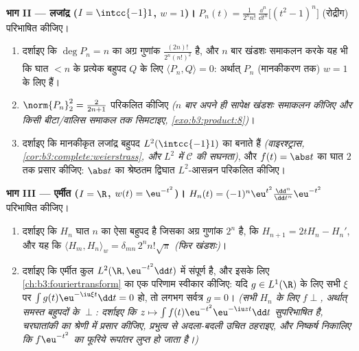 \begin{problem}
\medskip
\noindent\textbf{भाग II --- लजांद्र ($I = \intcc{-1}1$, $w =
1$)।} $P_n(t) = \frac{1}{2^nn!}\,\frac{\dd^n}{\dd
t^n}\bigl[(t^2 - 1)^n\bigr]$
(रोद्रीग) परिभाषित कीजिए।
\begin{enumerate}[resume]
  \item दर्शाइए कि $\deg P_n = n$ का अग्र गुणांक $\frac{(2n)!}{2^n(n!)^2}$ है, और $n$ बार
        खंडशः समाकलन करके यह भी कि घात $< n$ के प्रत्येक बहुपद
        $Q$ के लिए $\langle P_n, Q\rangle = 0$: अर्थात् $P_n$ (मानकीकरण तक) $w = 1$ के
        लिए  हैं।
  \item $\norm{P_n}_2^2 = \frac{2}{2n+1}$ परिकलित कीजिए \emph{($n$ बार अपने ही सापेक्ष
        खंडशः समाकलन कीजिए और किसी बीटा/वालिस समाकल तक सिमटाइए,
        \cref{exo:b3:product:8})}।
  \item दर्शाइए कि मानकीकृत लजांद्र बहुपद $L^2(\intcc{-1}1)$ का 
        बनाते हैं \emph{(वाइरश्ट्रास, \cref{cor:b3:complete:weierstrass}, और $L^2$ में $\mathcal C$
        की सघनता)}, और $f(t) = \abs t$ का घात $2$ तक प्रसार कीजिए: $\abs t$
        का श्रेष्ठतम द्विघात $L^2$-आसन्नन परिकलित कीजिए।
\end{enumerate}

\medskip
\noindent\textbf{भाग III --- एर्मीत ($I = \R$, $w(t) =
\eu^{-t^2}$)।} $H_n(t) =
(-1)^n\eu^{t^2}\frac{\dd^n}{\dd t^n}\eu^{-t^2}$
परिभाषित कीजिए।
\begin{enumerate}[resume]
  \item दर्शाइए कि $H_n$ घात $n$ का ऐसा बहुपद है जिसका अग्र
        गुणांक $2^n$ है, कि $H_{n+1} = 2tH_n -
        H_n'$, और यह कि $\langle H_m, H_n\rangle_w =
        \delta_{mn}\,2^nn!\sqrt\pi$ \emph{(फिर
        खंडशः)}।
  \item दर्शाइए कि एर्मीत कुल $L^2(\R,
        \eu^{-t^2}\dd t)$ में संपूर्ण है, और इसके लिए
        \cref{ch:b3:fouriertransform} का एक परिणाम स्वीकार कीजिए: यदि $g \in L^1(\R)$ के लिए सभी
        $\xi$ पर $\int g(t)\eu^{-\iu\xi t}\dd t = 0$ हो, तो लगभग सर्वत्र $g = 0$। \emph{(सभी
        $H_n$ के लिए $f \perp$, अर्थात् समस्त बहुपदों के $\perp$: दर्शाइए
        कि $z \mapsto \int
        f(t)\eu^{-t^2}\eu^{-\iu zt}\dd t$ सुपरिभाषित है, चरघातांकी का श्रेणी में प्रसार
        कीजिए, प्रभुत्व से अदला-बदली उचित ठहराइए, और निष्कर्ष
        निकालिए कि $f\eu^{-t^2}$ का फूरिये रूपांतर लुप्त हो जाता है।)}
\end{enumerate}


\end{problem}
